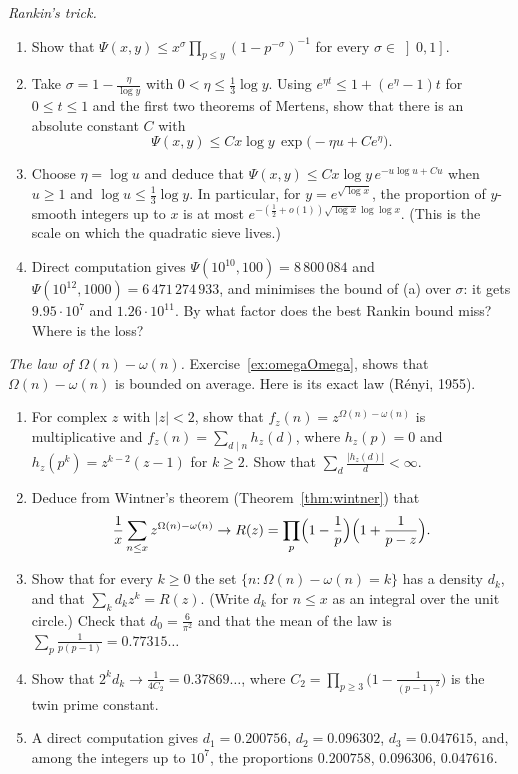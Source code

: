 \begin{exercise}[$\star\star$]\label{pb:rankin}
\emph{Rankin's trick.}
\begin{enumerate}[label=(\alph*)]
\item Show that $\Psi(x,y)\le x^\sigma\prod_{p\le y}(1-p^{-\sigma})^{-1}$ for every $\sigma\in\left]0,1\right]$.
\item Take $\sigma=1-\frac\eta{\log y}$ with $0<\eta\le\frac13\log y$. Using $e^{\eta t}\le1+(e^\eta-1)t$ for $0\le t\le1$ and the first two theorems of Mertens, show that
there is an absolute constant $C$ with
\[
\Psi(x,y)\le Cx\log y\,\exp\bigl(-\eta u+Ce^\eta\bigr).
\]
\item Choose $\eta=\log u$ and deduce that $\Psi(x,y)\le Cx\log y\,e^{-u\log u+Cu}$ when $u\ge1$ and $\log u\le\frac13\log y$. In particular, for $y=e^{\sqrt{\log x}}$,
the proportion of $y$-smooth integers up to $x$ is at most $e^{-(\frac12+o(1))\sqrt{\log x}\log\log x}$. (This is the scale on which the quadratic sieve lives.)
\item Direct computation gives $\Psi(10^{10},100)=8\,800\,084$ and $\Psi(10^{12},1000)=6\,471\,274\,933$, and minimises the bound of (a) over $\sigma$: it gets
$9.95\cdot10^7$ and $1.26\cdot10^{11}$. By what factor does the best Rankin bound miss? Where is the loss?
\end{enumerate}
\end{exercise}

\begin{exercise}[$\star\star\star$]\label{pb:renyi}
\emph{The law of $\Omega(n)-\omega(n)$.} Exercise~\ref{ex:omegaOmega}, shows that $\Omega(n)-\omega(n)$ is bounded on average. Here is its exact law (R\'enyi, 1955).
\begin{enumerate}[label=(\alph*)]
\item For complex $z$ with $|z|<2$, show that $f_z(n)=z^{\Omega(n)-\omega(n)}$ is multiplicative and $f_z(n)=\sum_{d\mid n}h_z(d)$, where $h_z(p)=0$ and $h_z(p^k)=z^{k-2}(z-1)$ for $k\ge2$.
Show that $\sum_d\frac{|h_z(d)|}d<\infty$.
\item Deduce from Wintner's theorem (Theorem~\ref{thm:wintner}) that
\[
\frac1x\sum_{n\le x}z^{\Omega(n)-\omega(n)}\to R(z)=\prod_p\Bigl(1-\frac1p\Bigr)\Bigl(1+\frac1{p-z}\Bigr).
\]
\item Show that for every $k\ge0$ the set $\{n:\Omega(n)-\omega(n)=k\}$ has a density $d_k$, and that $\sum_kd_kz^k=R(z)$. (Write $d_k$ for $n\le x$ as an integral over the
unit circle.) Check that $d_0=\frac6{\pi^2}$ and that the mean of the law is $\sum_p\frac1{p(p-1)}=0.77315\ldots$
\item Show that $2^kd_k\to\frac1{4C_2}=0.37869\ldots$, where $C_2=\prod_{p\ge3}\bigl(1-\frac1{(p-1)^2}\bigr)$ is the twin prime constant.
\item A direct computation gives $d_1=0.200756$, $d_2=0.096302$, $d_3=0.047615$, and, among the integers up to $10^7$, the proportions $0.200758$, $0.096306$, $0.047616$.
\end{enumerate}
\end{exercise}

